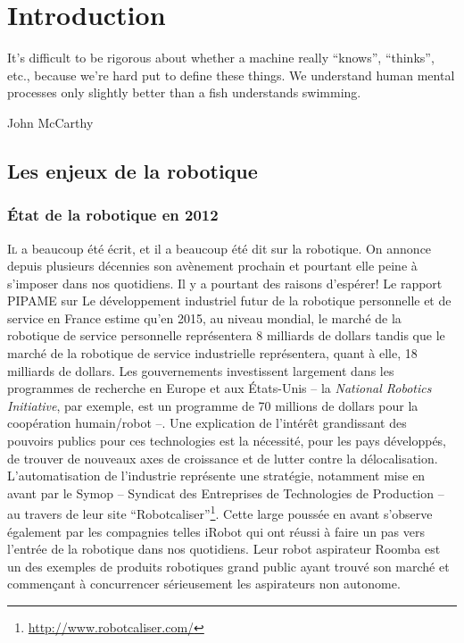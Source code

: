 \chapter{Introduction}\label{chap:chap0}

\epigraph{It's difficult to be rigorous about whether a machine really
  ``knows'', ``thinks'', etc., because we're hard put to define these
  things. We understand human mental processes only slightly better
  than a fish understands swimming.}{John McCarthy}
\clearpage

\section{Les enjeux de la robotique}

\subsection{État de la robotique en 2012}

\lettrine[lines=2, lraise=0.1, nindent=0em, slope=-.5em]%
{I}{l} a beaucoup été écrit, et il a beaucoup été dit sur la
robotique. On annonce depuis plusieurs décennies son avènement
prochain et pourtant elle peine à s'imposer dans nos quotidiens. Il y
a pourtant des raisons d'espérer! Le rapport PIPAME sur Le
développement industriel futur de la robotique personnelle et de
service en France \citep{pipame} estime qu'en 2015, au niveau mondial,
le marché de la robotique de service personnelle représentera 8
milliards de dollars tandis que le marché de la robotique de service
industrielle représentera, quant à elle, 18 milliards de dollars. Les
gouvernements investissent largement dans les programmes de recherche
en Europe et aux États-Unis -- la \emph{National Robotics Initiative},
par exemple, est un programme de 70 millions de dollars pour la
coopération humain/robot --. Une explication de l'intérêt grandissant
des pouvoirs publics pour ces technologies est la nécessité, pour les
pays développés, de trouver de nouveaux axes de croissance et de
lutter contre la délocalisation. L'automatisation de l'industrie
représente une stratégie, notamment mise en avant par le Symop --
Syndicat des Entreprises de Technologies de Production -- au travers
de leur site
``Robotcaliser''\footnote{\url{http://www.robotcaliser.com/}}. Cette
large poussée en avant s'observe également par les compagnies telles
iRobot qui ont réussi à faire un pas vers l'entrée de la robotique
dans nos quotidiens. Leur robot aspirateur Roomba est un des exemples
de produits robotiques grand public ayant trouvé son marché et
commençant à concurrencer sérieusement les aspirateurs non autonome.


